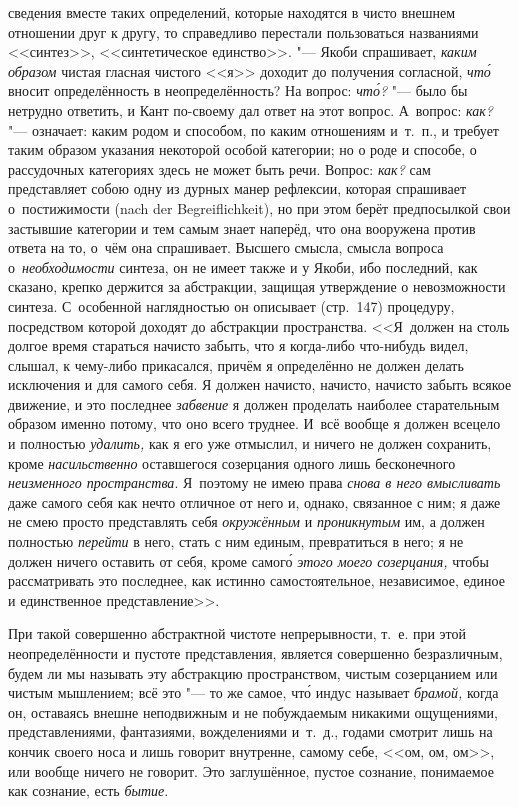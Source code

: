 сведения вместе таких определений, которые находятся в чисто внешнем отношении
друг к другу, то справедливо перестали пользоваться названиями <<синтез>>,
<<синтетическое единство>>. "--- Якоби спрашивает, {\em каким образом}
чистая гласная чистого <<я>> доходит до получения согласной, {\em чт\'{о}}
вносит определённость в неопределённость? На вопрос: {\em чт\'{о}?} "--- было бы
нетрудно ответить, и Кант по-своему дал ответ на этот вопрос. А~вопрос:
{\em как?} "--- означает: каким родом и способом, по каким отношениям и~т.~п.,
и требует таким образом указания некоторой особой категории; но о роде и
способе, о рассудочных категориях здесь не может быть речи. Вопрос: {\em как?}
сам представляет собою одну из дурных манер рефлексии, которая спрашивает
о~постижимости (nach der Begrei\-flich\-keit), но при этом берёт предпосылкой
свои застывшие категории и тем самым знает наперёд, что она вооружена против
ответа на то, о~чём она спрашивает. Высшего смысла, смысла вопроса
о~{\em необходимости} синтеза, он не имеет также и у Якоби, ибо последний, как
сказано, крепко держится за абстракции, защищая утверждение о невозможности
синтеза. С~особенной наглядностью он описывает (стр.~147) процедуру,
посредством которой доходят до абстракции пространства. <<Я~должен на столь
долгое время стараться начисто забыть, что я когда-либо что-нибудь видел,
слышал, к чему-либо прикасался, причём я определённо не должен делать
исключения и для самого себя. Я должен начисто, начисто, начисто забыть всякое
движение, и это последнее {\em забвение} я должен проделать наиболее
старательным образом именно потому, что оно всего труднее. И~всё вообще я
должен всецело и полностью {\em удалить,} как я его уже отмыслил, и ничего не
должен сохранить, кроме {\em насильственно} оставшегося созерцания одного лишь
бесконечного {\em неизменного пространства}. Я~поэтому не имею права
{\em снова в него вмысливать} даже самого себя как нечто отличное от него и,
однако, связанное с ним; я даже не смею просто представлять себя
{\em окружённым} и {\em проникнутым} им, а должен полностью {\em перейти} в
него, стать с ним единым, превратиться в него; я не должен ничего оставить от
себя, кроме самог\'{о} {\em этого моего созерцания,} чтобы рассматривать это
последнее, как истинно самостоятельное, независимое, единое и единственное
представление>>.

При такой совершенно абстрактной чистоте непрерывности, т.~е. при этой
неопределённости и пустоте представления, является совершенно безразличным,
будем ли мы называть эту абстракцию пространством, чистым созерцанием или
чистым мышлением; всё это "--- то же самое, чт\'{о} индус называет
{\em брамой,} когда он, оставаясь внешне неподвижным и не побуждаемым
никакими ощущениями, представлениями, фантазиями, вожделениями и~т.~д.,
годами смотрит лишь на кончик своего носа и лишь говорит внутренне, самому
себе, <<ом, ом, ом>>, или вообще ничего не говорит. Это заглушённое, пустое
сознание, понимаемое как сознание, есть {\em бытие}.

